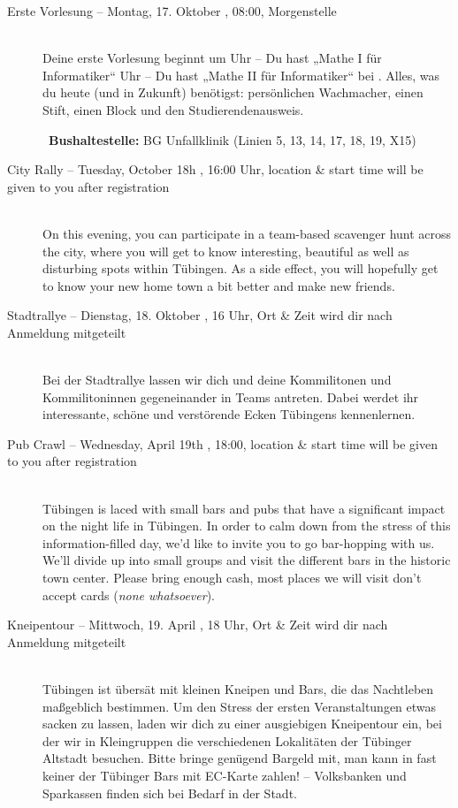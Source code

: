 \begin{description}
\ifbachelor
\item[Erste Vorlesung -- Montag, 17. Oktober \YEAR, 08:00, Morgenstelle]~\\
Deine erste Vorlesung beginnt um
 Uhr -- Du hast „Mathe I für Informatiker“  \fi
{} Uhr -- Du hast „Mathe II für Informatiker“  \fi
bei \Matheprof.
Alles, was du heute (und in Zukunft) benötigst: persönlichen Wachmacher, einen Stift, einen Block und den Studierendenausweis.

~\textbf{Bushaltestelle:} BG Unfallklinik (Linien 5, 13, 14, 17, 18, 19, X15)
\fi


\ifml
	\item[City Rally -- Tuesday, October 18h \YEAR, 16:00 Uhr, \footnotesize{location \& start time will be given to you after registration}]~\\
	On this evening, you can participate in a team-based scavenger hunt across the city,
	where you will get to know interesting, beautiful as well as disturbing spots within Tübingen.
	As a side effect, you will hopefully get to know your new home town a bit better and make new friends.
\else
	\item[Stadtrallye -- Dienstag, 18. Oktober \YEAR, 16 Uhr, \footnotesize{Ort \& Zeit wird dir nach Anmeldung mitgeteilt}]~\\
	Bei der Stadtrallye lassen wir dich und deine Kommilitonen und Kommilitoninnen gegeneinander in Teams antreten.
	Dabei werdet ihr interessante, schöne und verstörende Ecken Tübingens kennenlernen.
\fi


\ifml
\item[Pub Crawl -- Wednesday, April 19th \YEAR, 18:00, \footnotesize{location \& start time will be given to you after registration}]~\\
Tübingen is laced with small bars and pubs that have a significant impact on the night life in Tübingen.
In order to calm down from the stress of this information-filled day, we'd like to invite you to go bar-hopping with us.
We'll divide up into small groups and visit the different bars in the historic town center.
Please bring enough cash, most places we will visit don't accept cards (\emph{none whatsoever}).

\else
\item[Kneipentour -- Mittwoch, 19. April \YEAR, 18 Uhr, \footnotesize{Ort \& Zeit wird dir nach Anmeldung mitgeteilt}]~\\
Tübingen ist übersät mit kleinen Kneipen und Bars, die das Nachtleben maßgeblich bestimmen.
Um den Stress der ersten Veranstaltungen etwas sacken zu lassen, laden wir dich zu einer ausgiebigen Kneipentour ein,
bei der wir in Kleingruppen die verschiedenen Lokalitäten der Tübinger Altstadt besuchen.
Bitte bringe genügend Bargeld mit, man kann in fast keiner der Tübinger Bars mit EC-Karte zahlen! -- Volksbanken und Sparkassen finden sich bei Bedarf in der Stadt.
\fi


\end{description}

